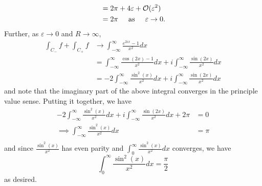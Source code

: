 \documentclass{article}
\begin{document}
\begin{itemize}
\begin{align*}
        &= 2\pi + 4\varepsilon + \mathcal{O}(\varepsilon^2)\\
        &= 2\pi \hspace{0.5cm} \text{as} \hspace{0.5cm} \varepsilon \to 0.
    \end{align*}
    Further, as $\varepsilon \to 0$ and $R \to \infty$, 
    \begin{align*}
        \int_{C_-}f + \int_{C_+}f &\to \int_{-\infty}^{\infty} \frac{e^{2ix} - 1}{x^2} dx\\
        &= \int_{-\infty}^{\infty}\frac{\cos(2x) - 1}{x^2}dx + i\int_{-\infty}^{\infty}\frac{\sin(2x)}{x^2}dx\\
        &= -2\int_{-\infty}^{\infty}\frac{\sin^2(x)}{x^2}dx + i\int_{-\infty}^{\infty}\frac{\sin(2x)}{x^2}dx
    \end{align*}
    and note that the imaginary part of the above integral converges in the principle value sense. Putting it together, we have
    \begin{align*}
        -2\int_{-\infty}^{\infty}\frac{\sin^2(x)}{x^2}dx + i\int_{-\infty}^{\infty}\frac{\sin(2x)}{x^2}dx + 2\pi &= 0\\
        \implies \int_{-\infty}^{\infty}\frac{\sin^2(x)}{x^2}dx &= \pi\\
    \end{align*}
    and since $\frac{\sin^2(x)}{x^2}$ has even parity and ${\displaystyle \int_0^{\infty} \frac{\sin^2(x)}{x^2}dx }$ converges, we have
    \[\int_0^{\infty}\frac{\sin^2(x)}{x^2}dx = \frac{\pi}{2}\]
    as desired.


\end{itemize}
\end{document}
